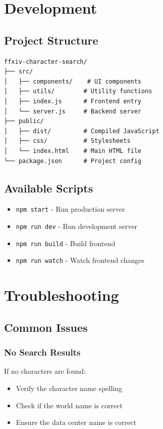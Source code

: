 \documentclass[12pt]{article}
\begin{document}
\section{Development}

\subsection{Project Structure}
\begin{lstlisting}
ffxiv-character-search/
├── src/
│   ├── components/    # UI components
│   ├── utils/        # Utility functions
│   ├── index.js      # Frontend entry
│   └── server.js     # Backend server
├── public/
│   ├── dist/         # Compiled JavaScript
│   ├── css/          # Stylesheets
│   └── index.html    # Main HTML file
└── package.json      # Project config
\end{lstlisting}

\subsection{Available Scripts}
\begin{itemize}
    \item \texttt{npm start} - Run production server
    \item \texttt{npm run dev} - Run development server
    \item \texttt{npm run build} - Build frontend
    \item \texttt{npm run watch} - Watch frontend changes
\end{itemize}

\section{Troubleshooting}

\subsection{Common Issues}

\subsubsection{No Search Results}
If no characters are found:
\begin{itemize}
    \item Verify the character name spelling
    \item Check if the world name is correct
    \item Ensure the data center name is correct
\end{itemize}
\end{document}
